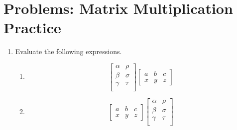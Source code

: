 \documentclass[12pt]{article}
\begin{document}
\section*{Problems: Matrix Multiplication Practice}
\begin{enumerate}
\item Evaluate the following expressions.
\begin{enumerate}

\item
\begin{equation*}
\begin{bmatrix}
\alpha & \rho \\
\beta & \sigma \\
\gamma & \tau \\
\end{bmatrix}\begin{bmatrix}
a & b & c \\
x & y & z
\end{bmatrix}
\end{equation*}


\item
\begin{equation*}
\begin{bmatrix}
a & b & c \\
x & y & z
\end{bmatrix} 
\begin{bmatrix}
\alpha & \rho \\
\beta & \sigma \\
\gamma & \tau \\
\end{bmatrix} 
\end{equation*}


\end{enumerate}
\end{enumerate}
\end{document}
